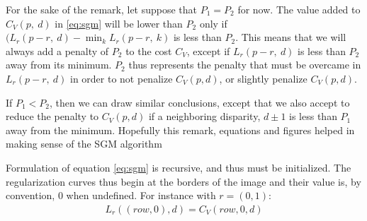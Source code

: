 \begin{remark}
    For the sake of the remark, let suppose that $P_1=P_2$ for now. The value added to $C_V(p, ~d)$ in \eqref{eq:sgm} will be lower than $P_2$ only if $(L_r(p-r,~d) - \min_k L_r(p-r,~k)$ is less than $P_2$. This means that we will always add a penalty of $P_2$ to the cost $C_V$, except if $L_r(p-r,~d)$ is less than $P_2$ away from its minimum. $P_2$ thus represents the penalty that must be overcame in $L_r(p-r,~d)$ in order to not penalize $C_V(p,d)$, or slightly penalize $C_V(p,d)$.
    
    If $P_1<P_2$, then we can draw similar conclusions, except that we also accept to reduce the penalty to $C_V(p,d)$ if a neighboring disparity, \ie $d\pm1$ is less than $P_1$ away from the minimum. Hopefully this remark, equations and figures helped in making sense of the SGM algorithm
\end{remark}

Formulation of equation \eqref{eq:sgm} is recursive, and thus must be initialized. The regularization curves thus begin at the borders of the image and their value is, by convention, $0$ when undefined. For instance with $r=(0,1)$:
\begin{align*}
    L_r((row, 0),d) = C_V(row, 0 ,d)
\end{align*} 

